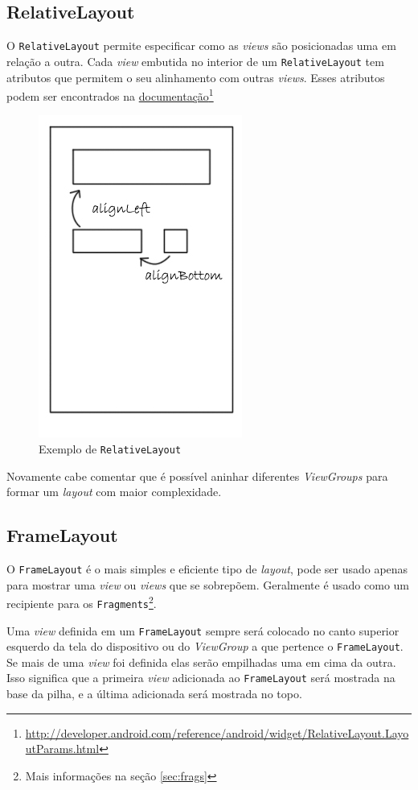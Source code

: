 \documentclass[a4paper,12pt,brazil,oneside]{book}
\begin{document}
\subsection{RelativeLayout}
\label{subsec:relativelayout}

O \texttt{RelativeLayout} permite especificar como as \emph{views} são posicionadas uma em relação a outra. Cada \emph{view} embutida no interior de um \texttt{RelativeLayout} tem atributos que permitem o seu alinhamento com outras \emph{views}. Esses atributos podem ser encontrados na \href{http://developer.android.com/reference/android/widget/RelativeLayout.LayoutParams.html}{documentação}\footnote{ \href{http://developer.android.com/reference/android/widget/RelativeLayout.LayoutParams.html}{http://developer.android.com/reference/android/widget/RelativeLayout.LayoutParams.html}}

\begin{figure}[H]
  \centering
  \includegraphics[width=.25\textwidth]{figuras/design/relativelayout.jpg}
  \caption{Exemplo de \texttt{RelativeLayout}}
  \label{fig:e5}
\end{figure}

Novamente cabe comentar que é possível aninhar diferentes \emph{ViewGroups} para formar um \emph{layout} com maior complexidade.

\subsection{FrameLayout}

O \texttt{FrameLayout} é o mais simples e eficiente tipo de \emph{layout}, pode ser usado apenas para mostrar uma \emph{view} ou \emph{views} que se sobrepõem. Geralmente é usado como um recipiente para os \texttt{Fragments}\footnote{Mais informações na seção \ref{sec:frags}}.

Uma \emph{view} definida em um \texttt{FrameLayout} sempre será colocado no canto superior esquerdo da tela do dispositivo ou do \emph{ViewGroup} a que pertence o \texttt{FrameLayout}. Se mais de uma \emph{view} foi definida elas serão empilhadas uma em cima da outra. Isso significa que a primeira \emph{view} adicionada ao \texttt{FrameLayout} será mostrada na base da pilha, e a última adicionada será mostrada no topo.
\end{document}
